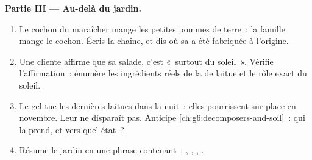 \begin{problem}
\medskip\noindent\textbf{Partie III --- Au-delà du jardin.}
\begin{enumerate}[resume]
  \item Le cochon du maraîcher mange les petites pommes de terre~;
        la famille mange le cochon. Écris la chaîne, et dis où sa
         a été fabriquée à l'origine.
  \item Une cliente affirme que sa salade, c'est «~surtout du
        soleil~». Vérifie l'affirmation~: énumère les ingrédients
        réels de la  de laitue et le rôle exact du soleil.
  \item Le gel tue les dernières laitues dans la nuit~; elles
        pourrissent sur place en novembre. Leur 
        ne disparaît pas. Anticipe
        \cref{ch:g6:decomposers-and-soil}~: qui la prend, et vers
        quel état~?
  \item Résume le jardin en une phrase contenant~: ,
        , , .
\end{enumerate}
\end{problem}
